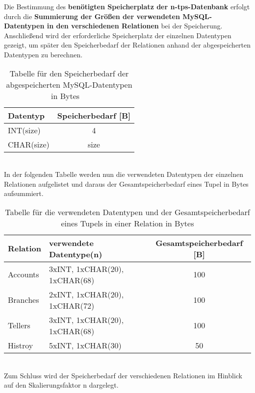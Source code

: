 Die Bestimmung des \textbf{benötigten Speicherplatz der n-tps-Datenbank} erfolgt durch die \textbf{Summierung der Größen der verwendeten MySQL-Datentypen in den verschiedenen Relationen} bei der Speicherung.
Anschließend wird der erforderliche Speicherplatz der einzelnen Datentypen gezeigt, um später den Speicherbedarf der Relationen anhand der abgespeicherten Datentypen zu berechnen.
\begin{table}[h!]
    \centering
    \begin{tabular}{|p{3cm}|c|}
        \hline
        Datentyp & Speicherbedarf [B] \\  \hline
        INT(size) & 4 \\ \hline
        CHAR(size) & size \\ \hline
    \end{tabular}
    \caption{Tabelle für den Speicherbedarf der abgespeicherten MySQL-Datentypen in Bytes~\autocite{mysql-2022}~\autocite{dzone-2022}}
    \label{tab:2}
\end{table} \\
In der folgenden Tabelle werden nun die verwendeten Datentypen der einzelnen Relationen aufgelistet und daraus der Gesamtspeicherbedarf eines Tupel in Bytes aufsummiert.
\begin{table}[h!]
    \centering
    \begin{tabular}{|p{1.5cm}|l|c|}
        \hline
        Relation & verwendete Datentype(n) & Gesamtspeicherbedarf [B] \\  \hline
        Accounts & 3xINT, 1xCHAR(20), 1xCHAR(68) & 100 \\ \hline
        Branches & 2xINT, 1xCHAR(20), 1xCHAR(72) & 100 \\ \hline
        Tellers & 3xINT, 1xCHAR(20), 1xCHAR(68) & 100 \\ \hline
        Histroy & 5xINT, 1xCHAR(30) & 50 \\ \hline
    \end{tabular}
    \caption{Tabelle für die verwendeten Datentypen und der Gesamtspeicherbedarf eines Tupels in einer Relation in Bytes}
    \label{tab:3}
\end{table} \\
Zum Schluss wird der Speicherbedarf der verschiedenen Relationen im Hinblick auf den Skalierungsfaktor n dargelegt.

